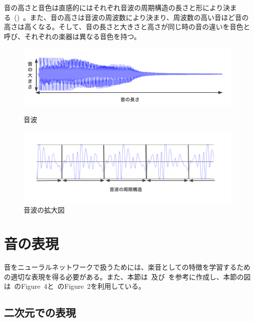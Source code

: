 音の高さと音色は直感的にはそれぞれ音波の周期構造の長さと形により決まる~()~。また、音の高さは音波の周波数により決まり、周波数の高い音ほど音の高さは高くなる。そして、音の長さと大きさと高さが同じ時の音の違いを音色と呼び、それぞれの楽器は異なる音色を持つ。

\begin{figure}[b]
\centering
\begin{minipage}{0.48\columnwidth}
\centering
\includegraphics[width=\columnwidth]{figure/gakuon1.png}
\caption{音波}
\label{fig:gakuon1}
\end{minipage}
\begin{minipage}{0.48\columnwidth}
\centering
\includegraphics[width=\columnwidth]{figure/gakuon2.png}
\caption{音波の拡大図}
\label{fig:gakuon2}
\end{minipage}
\end{figure}

\clearpage

\section{音の表現}

音をニューラルネットワークで扱うためには、楽音としての特徴を学習するための適切な表現を得る必要がある。また、本節は~\cite{musictutorial}及び~\cite{DL_ASP}を参考に作成し、本節の図は~\cite{musictutorial}のFigure~4と~\cite{timbretron}のFigure~2を利用している。

\subsection{二次元での表現}

